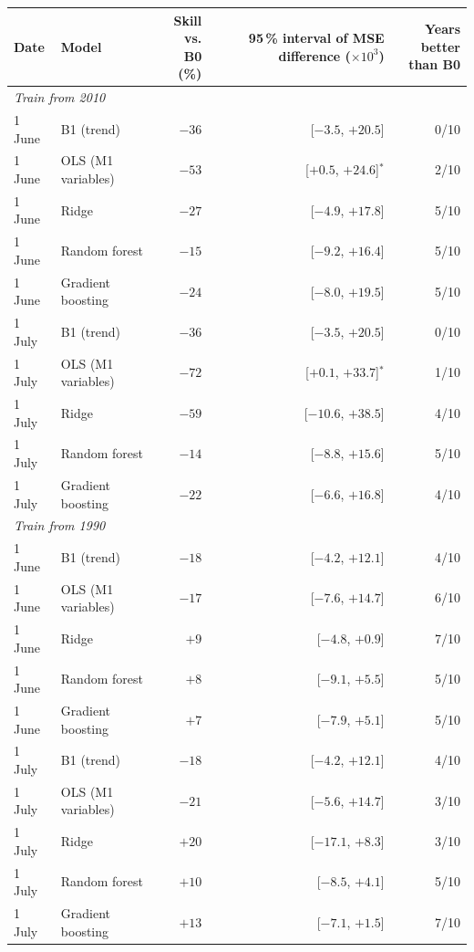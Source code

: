\begin{tabular}{llrrr}
\toprule
Date & Model & \shortstack{Skill vs.\\B0 (\%)} & \shortstack{95\,\% interval of MSE\\difference ($\times 10^3$)} & \shortstack{Years better\\than B0} \\
\midrule
\multicolumn{5}{l}{\emph{Train from 2010}} \\
1 June & B1 (trend) & $-36$ & [$-3.5$, $+20.5$] & 0/10 \\
1 June & OLS (M1 variables) & $-53$ & [$+0.5$, $+24.6$]$^*$ & 2/10 \\
1 June & Ridge & $-27$ & [$-4.9$, $+17.8$] & 5/10 \\
1 June & Random forest & $-15$ & [$-9.2$, $+16.4$] & 5/10 \\
1 June & Gradient boosting & $-24$ & [$-8.0$, $+19.5$] & 5/10 \\
1 July & B1 (trend) & $-36$ & [$-3.5$, $+20.5$] & 0/10 \\
1 July & OLS (M1 variables) & $-72$ & [$+0.1$, $+33.7$]$^*$ & 1/10 \\
1 July & Ridge & $-59$ & [$-10.6$, $+38.5$] & 4/10 \\
1 July & Random forest & $-14$ & [$-8.8$, $+15.6$] & 5/10 \\
1 July & Gradient boosting & $-22$ & [$-6.6$, $+16.8$] & 4/10 \\
\multicolumn{5}{l}{\emph{Train from 1990}} \\
1 June & B1 (trend) & $-18$ & [$-4.2$, $+12.1$] & 4/10 \\
1 June & OLS (M1 variables) & $-17$ & [$-7.6$, $+14.7$] & 6/10 \\
1 June & Ridge & $+9$ & [$-4.8$, $+0.9$] & 7/10 \\
1 June & Random forest & $+8$ & [$-9.1$, $+5.5$] & 5/10 \\
1 June & Gradient boosting & $+7$ & [$-7.9$, $+5.1$] & 5/10 \\
1 July & B1 (trend) & $-18$ & [$-4.2$, $+12.1$] & 4/10 \\
1 July & OLS (M1 variables) & $-21$ & [$-5.6$, $+14.7$] & 3/10 \\
1 July & Ridge & $+20$ & [$-17.1$, $+8.3$] & 3/10 \\
1 July & Random forest & $+10$ & [$-8.5$, $+4.1$] & 5/10 \\
1 July & Gradient boosting & $+13$ & [$-7.1$, $+1.5$] & 7/10 \\
\bottomrule
\end{tabular}
